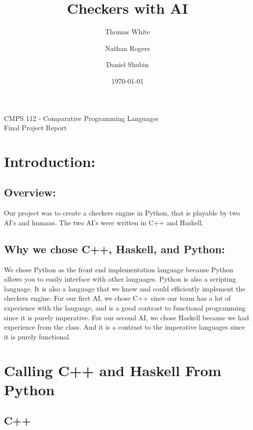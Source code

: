 \documentclass[12pt]{article}
\begin{document}
\begin{titlepage}
\title{\huge \bf Checkers with AI}
\date{\today}
\author{Thomas White \\
    \and Nathan Rogers \\
    \and Daniel Shubin}
\maketitle
\begin{center}
    CMPS 112 - Comparative Programming Languages \\
    Final Project Report
\end{center}
\end{titlepage}

\section{Introduction:}
    \subsection{Overview:}
        Our project was to create a checkers engine in Python,
        that is playable by two AI's and humans. The two AI's
        were written in C++ and Haskell.
    \subsection{Why we chose C++, Haskell, and Python:}
        We chose Python as the front end implementation language
        because Python allows you to easily interface with other
        languages. Python is also a scripting language.
        It is also a language that we knew and could efficiently
        implement the checkers engine.
        For our first AI, we chose C++ since our team has a lot of
        experience with the language, and is a good contrast to functional
        programming since it is purely imperative.
        For our second AI, we chose Haskell because we had experience from
        the class. And it is a contrast to the imperative languages since
        it is purely functional.


\section{Calling C++ and Haskell From Python}
    \subsection{C++}
\end{document}
